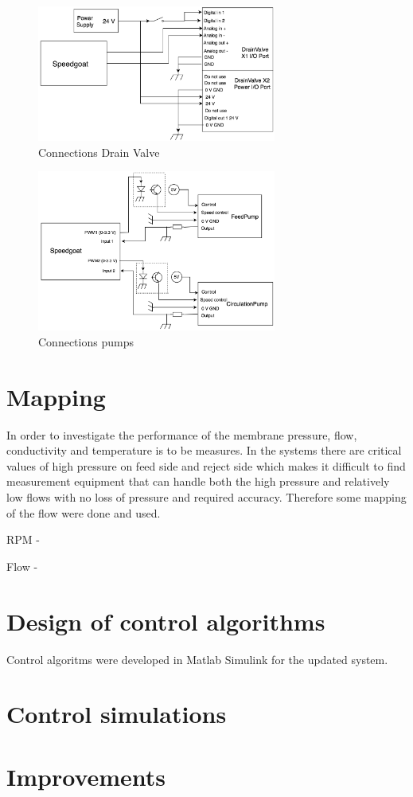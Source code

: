 \begin{figure}[h]
    \centering
    \includegraphics[width=0.7\textwidth]{ValveConn}
    \caption{Connections Drain Valve}
    \label{fig:ValveConn}
\end{figure}

\begin{figure}[h]
    \centering
    \includegraphics[width=0.7\textwidth]{PumpConn}
    \caption{Connections pumps}
    \label{fig:PumpConn}
\end{figure}


\section{Mapping}
In order to investigate the performance of the membrane pressure, flow, conductivity and temperature is to be measures. In the systems there are critical values of high pressure on feed side and reject side which makes it difficult to find measurement equipment that can handle both the high pressure and relatively low flows with no loss of pressure and required accuracy. Therefore some mapping of the flow were done and used. 

RPM - 

Flow - 



\section{Design of control algorithms}
Control algoritms were developed in Matlab Simulink for the updated system. 

\section{Control simulations}



\section{Improvements}

